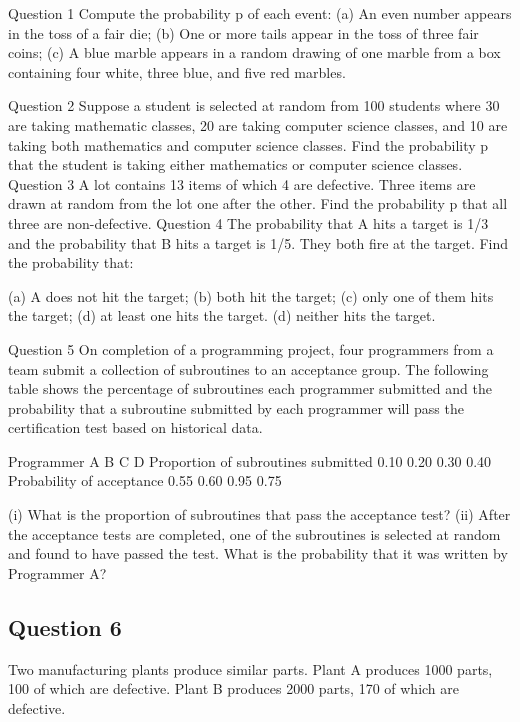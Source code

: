 	
Question 1
Compute the probability p of each event:
(a) An even number appears in the toss of a fair die;
(b) One or more tails appear in the toss of three fair coins;
(c) A blue marble appears in a random drawing of one marble from a box containing four white, three blue, and five red marbles.

Question 2
Suppose a student is selected at random from 100 students where 30 are taking mathematic classes, 20 are taking computer science classes, and 10 are taking  both mathematics and computer science classes. Find the probability p that the student is taking either mathematics or computer science classes.
Question 3
A lot contains 13 items of which 4 are defective. Three items are drawn at random from the lot one after the other. Find the probability p that all three are non-defective.
Question 4
The probability that A hits a target is 1/3 and the probability that B hits a target is 1/5.  They both fire at the target. Find the probability that:

(a) A does not hit the target; 
(b) both hit the target; 
(c) only one of them hits the target; 
(d) at least one hits the target.
(d) neither hits the target.

Question 5
On completion of a programming project, four programmers from a team submit a collection of subroutines to an acceptance group. The following table shows the percentage of subroutines each programmer submitted and the probability that a subroutine submitted by each programmer will pass the certification test based on historical data.

Programmer	A	B	C	D
Proportion of subroutines submitted	0.10	0.20	0.30	0.40
Probability of acceptance	0.55	0.60	0.95	0.75

(i) What is the proportion of subroutines that pass the acceptance test?
(ii) After the acceptance tests are completed, one of the subroutines is selected at random and found to have passed the test. What is the probability that it was written by Programmer A?



\subsection{Question 6}
Two manufacturing plants produce similar parts. Plant A produces 1000 parts, 100 of which are defective. Plant B produces 2000 parts, 170 of which are defective. 

